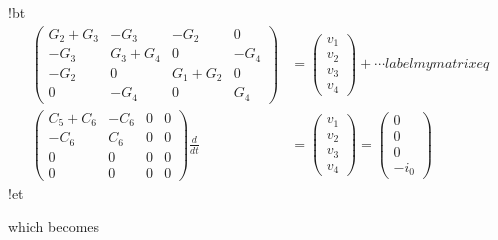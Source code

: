 \documentclass[%
oneside,                 %
final,                   %
10pt]{article}
\begin{document}
\blatexcod
!bt
\begin{align}
\begin{pmatrix}
G_2 + G_3 & -G_3 & -G_2 & 0 \\ 
-G_3 & G_3 + G_4 & 0 & -G_4 \\ 
-G_2 & 0 & G_1 + G_2 & 0 \\ 
0 & -G_4 & 0 & G_4
\end{pmatrix}
&=
\begin{pmatrix}
v_1 \\ 
v_2 \\ 
v_3 \\ 
v_4
\end{pmatrix}
+ \cdots
label{mymatrixeq}\\ 
\begin{pmatrix}
C_5 + C_6 & -C_6 & 0 & 0 \\ 
-C_6 & C_6 & 0 & 0 \\ 
0 & 0 & 0 & 0 \\ 
0 & 0 & 0 & 0
\end{pmatrix}
\frac{d}{dt} &=
\begin{pmatrix}
v_1 \\ 
v_2 \\ 
v_3 \\ 
v_4
\end{pmatrix} =
\begin{pmatrix}
0 \\ 
0 \\ 
0 \\ 
-i_0
\end{pmatrix}
\end{align}
!et
\elatexcod

which becomes
\end{document}
